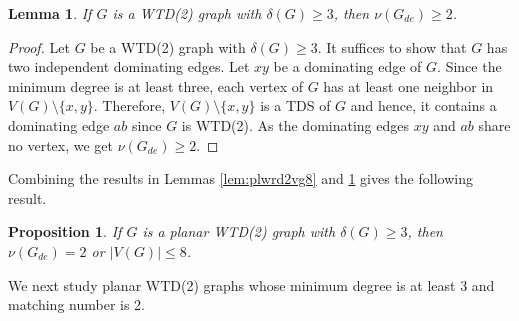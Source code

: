 \documentclass[11pt]{article}
\newtheorem{lemma}[theorem]{Lemma}
\newtheorem{proposition}[theorem]{Proposition}
\theoremstyle{definition}
\begin{document}
\begin{lemma}\label{lem:wtd2del3nu2}
If $G$ is a WTD(2) graph with $\delta(G)\geq 3$, then $\nu (G_{de})\geq 2$.
\end{lemma}
\begin{proof}
Let $G$ be a WTD(2) graph with $\delta(G)\geq 3$.
It suffices to show that $G$ has two independent dominating edges.
Let $xy$ be a dominating edge of $G$.
Since the minimum degree is at least three, each vertex of $G$ has at least one neighbor in $V(G)\setminus \{x,y\}$.
Therefore, $V(G)\setminus \{x,y\}$ is a TDS of $G$ and hence,
it contains a dominating edge $ab$ since $G$ is WTD(2).
As the dominating edges $xy$ and $ab$ share no vertex, we get $\nu (G_{de})\geq 2$.
\end{proof}

Combining the results in Lemmas \ref{lem:plwrd2vg8} and  \ref{lem:wtd2del3nu2} gives the following result.
\begin{proposition}\label{prop:nu2n8}
If $G$ is a planar WTD(2) graph with $\delta(G)\geq 3$,
then $\nu(G_{de})=2$ or $|V(G)|\leq 8$.
\end{proposition}

We next study planar WTD(2) graphs
whose minimum degree is at least 3 and matching number is 2.
\end{document}
